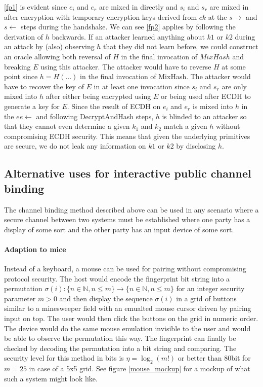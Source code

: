 \documentclass[12pt,a4paper,notitlepage]{article}
\begin{document}
\ref{fp1} is evident since $e_i$ and $e_r$ are mixed in directly and $s_i$ and $s_r$ are mixed in after encryption with
temporary encryption keys derived from $ck$ at the $s\rightarrow$ and $s\leftarrow$ steps during the handshake.
We can see \ref{fp2} applies by following the derivation of $h$ backwards. If an attacker learned anything about $k1$ or
$k2$ during an attack by (also) observing $h$ that they did not learn before, we could construct an oracle allowing both
reversal of $H$ in the final invocation of $MixHash$ and breaking $E$ using this attacker. The attacker would have to
reverse $H$ at some point since $h = H(\hdots)$ in the final invocation of MixHash. The attacker would have to recover
the key of $E$ in at least one invocation since $s_i$ and $s_r$ are only mixed into $h$ after either being encrypted
using $E$ or being used after ECDH to generate a key for $E$. Since the result of ECDH on $e_i$ and $e_r$ is mixed into
$h$ in the $ee\leftarrow$ and following DecryptAndHash steps, $h$ is blinded to an attacker so that they cannot even
determine a given $k_1$ and $k_2$ match a given $h$ without compromising ECDH security.
This means that given the underlying primitives are secure, we do not leak any information on $k1$ or $k2$ by disclosing
$h$.

\subsection{Alternative uses for interactive public channel binding}

The channel binding method described above can be used in any scenario where a secure channel between two systems must
be established where one party has a display of some sort and the other party has an input device of some sort. 

\paragraph{Adaption to mice} Instead of a keyboard, a mouse can be used for pairing without compromising protocol
security. The host would encode the fingerprint bit string into a permutation
$\sigma(i) : \{n\in\mathbb N, n\le m\} \rightarrow \{n\in\mathbb N, n\le m\}$ 
for an integer security parameter $m>0$
and then display the sequence $\sigma(i)$ in a grid of buttons similar to a minesweeper field with an emualted mouse
cursor driven by pairing input on top. The user would then click the buttons on the grid in numeric order. The device
would do the same mouse emulation invisible to the user and would be able to observe the permutation this way. The
fingerprint can finally be checked by decoding the permutation into a bit string and comparing. The security level for
this method in bits is $\eta = \log_2(m!)$ or better than 80bit for $m=25$ in case of a 5x5 grid.  See figure
\ref{mouse_mockup} for a mockup of what such a system might look like. 
\end{document}
